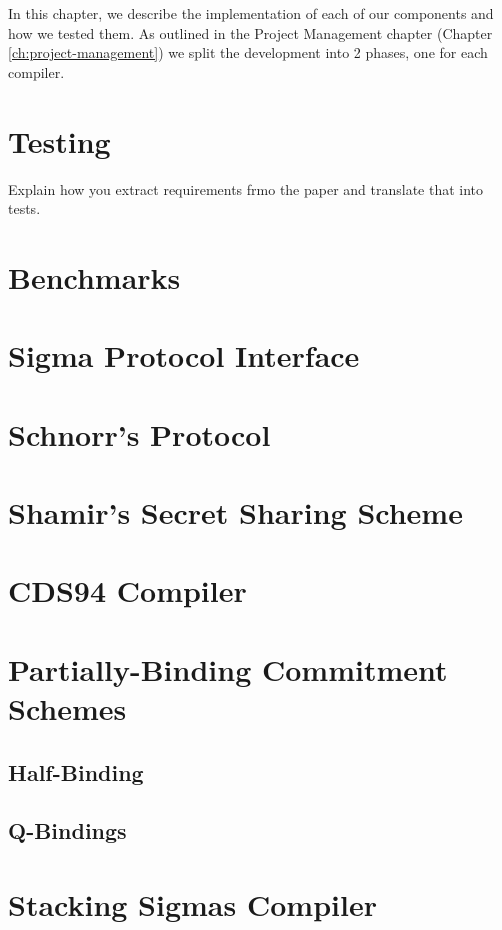In this chapter, we describe the implementation of each of our components and how we tested them. 
As outlined in the Project Management chapter (Chapter \ref{ch:project-management})
we split the development into 2 phases, one for each compiler. 

\section{Testing}

Explain how you extract requirements frmo the paper and translate that into tests. 

\section{Benchmarks}

\section{Sigma Protocol Interface}

\section{Schnorr's Protocol}

\section{Shamir's Secret Sharing Scheme}

\section{CDS94 Compiler}

\section{Partially-Binding Commitment Schemes}

\subsection{Half-Binding}

\subsection{Q-Bindings}

\section{Stacking Sigmas Compiler}


